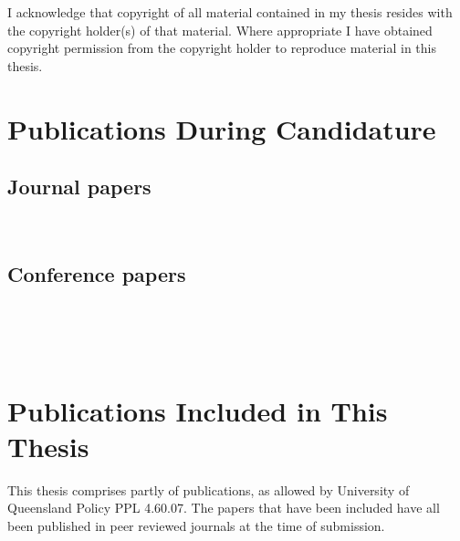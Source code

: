   I acknowledge that copyright of all material contained in my thesis resides with the copyright holder(s) of that material. Where appropriate I have obtained copyright permission from the copyright holder to reproduce material in this thesis.

\clearpage
\section*{Publications During Candidature}

\subsection*{Journal papers}

\noindent{}\\


\subsection*{Conference papers}

\noindent{}\\

\noindent{}\\

\noindent{}\\

\section*{Publications Included in This Thesis}

This thesis comprises partly of publications, as allowed by University of Queensland Policy PPL 4.60.07. The papers that have been included have all been published in peer reviewed journals at the time of submission. 

\vspace{\baselineskip}

